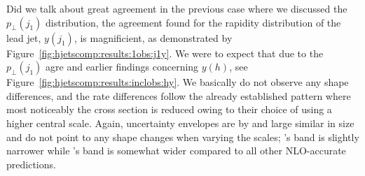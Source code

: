 Did we talk about great agreement in the previous case where we
discussed the $p_\perp(j_1)$ distribution, the agreement found for the
rapidity distribution of the lead jet, $y(j_1)$, is magnificient, as
demonstrated by Figure~\ref{fig:hjetscomp:results:1obs:j1y}. We were
to expect that due to the $p_\perp(j_1)$ agre and earlier findings
concerning $y(h)$, see Figure~\ref{fig:hjetscomp:results:inclobs:hy}.
We basically do not observe any shape differences, and the rate
differences follow the already established pattern where most
noticeably the \MGaMC cross section is reduced owing to their choice
of using a higher central scale. Again, uncertainty envelopes are
by and large similar in size and do not point to any shape changes
when varying the scales; \Herwig's band is slightly narrower while
\MGaMC's band is somewhat wider compared to all other NLO-accurate
predictions.

